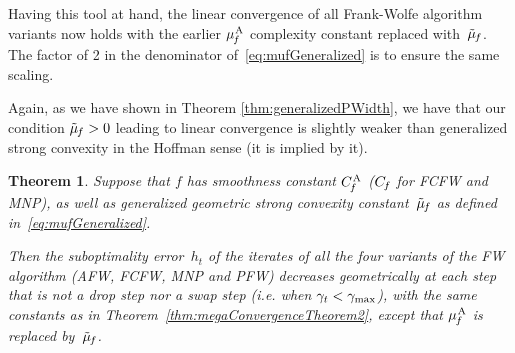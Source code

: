 \documentclass{article} %
\newtheorem{theorem}[definition]{Theorem}
\newcommand{\stepsize}{\gamma}
\newcommand{\stepmax}{\stepsize_{\textnormal{\scriptsize max}}} %
\newcommand{\away}{{\hspace{0.06em}\textnormal{\scriptsize A}}}
\newcommand{\Cf}{C_{\hspace{-0.08em}f}}
\newcommand{\CfAFW}{C_{\hspace{-0.08em}f}^\away}
\newcommand{\strongConvAFW}{\mu_{\hspace{-0.08em}f}^\away}
\newcommand{\strongConvGeneralized}{\tilde{\mu}_{\hspace{-0.08em}f}}
\newcommand{\0}{\mathbf{0}} %
\begin{document}
Having this tool at hand, the linear convergence of all Frank-Wolfe algorithm variants now holds with the earlier $\strongConvAFW$ complexity constant replaced with~$\strongConvGeneralized$. The factor of 2 in the denominator of~\eqref{eq:mufGeneralized} is to ensure the same scaling.%

Again, as we have shown in Theorem \ref{thm:generalizedPWidth}, we have that our condition $\strongConvGeneralized > 0$ leading to linear convergence is slightly weaker than generalized strong convexity in the Hoffman sense (it is implied by it).


\begin{theorem}\label{thm:megaConvergenceTheoremHoffman}
Suppose that $f$ has smoothness constant $\CfAFW$ ($\Cf$ for FCFW and
MNP),
as well as generalized geometric strong convexity constant~$\strongConvGeneralized$ as defined
in~\eqref{eq:mufGeneralized}.
%

Then the suboptimality error~$h_t$ of the iterates of all the four variants of the FW algorithm (AFW, FCFW, MNP and PFW) decreases geometrically at each step that is not a drop step nor a swap step (i.e.
when $\stepsize_t < \stepmax$), with the same constants as in Theorem~\ref{thm:megaConvergenceTheorem2}, except that $\strongConvAFW$ is replaced by~$\strongConvGeneralized$.
\end{theorem}
\end{document}
